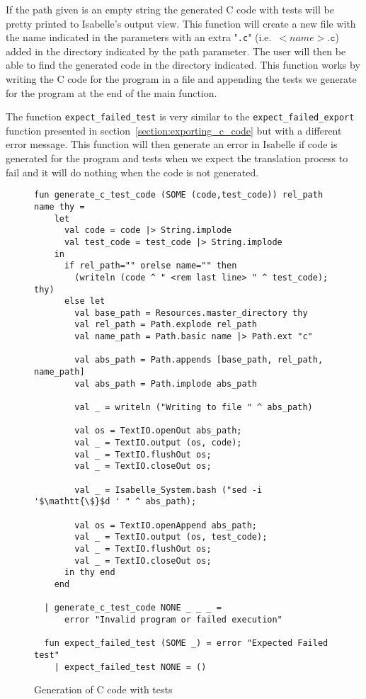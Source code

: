 If the path given is an empty string the generated C code with tests will be pretty printed to Isabelle's output view.
This function will create a new file with the name indicated in the parameters with an extra "\verb|.c|" (i.e.\ $<name>\mathtt{.c}$) added in the directory indicated by the path parameter.
The user will then be able to find the generated code in the directory indicated.
This function works by writing the C code for the program in a file and appending the tests we generate for the program at the end of the main function.

The function \verb|expect_failed_test| is very similar to the \verb|expect_failed_export| function presented in section~\ref{section:exporting_c_code} but with a different error message.
This function will then generate an error in Isabelle if code is generated for the program and tests when we expect the translation process to fail and it will do nothing when the code is not generated.

\begin{figure}
\begin{lstlisting}[mathescape=true]
  fun generate_c_test_code (SOME (code,test_code)) rel_path name thy =
    let
      val code = code |> String.implode
      val test_code = test_code |> String.implode
    in
      if rel_path="" orelse name="" then
        (writeln (code ^ " <rem last line> " ^ test_code); thy)
      else let
        val base_path = Resources.master_directory thy
        val rel_path = Path.explode rel_path
        val name_path = Path.basic name |> Path.ext "c"

        val abs_path = Path.appends [base_path, rel_path, name_path]
        val abs_path = Path.implode abs_path

        val _ = writeln ("Writing to file " ^ abs_path)

        val os = TextIO.openOut abs_path;
        val _ = TextIO.output (os, code);
        val _ = TextIO.flushOut os;
        val _ = TextIO.closeOut os;

        val _ = Isabelle_System.bash ("sed -i '$\mathtt{\$}$d ' " ^ abs_path);

        val os = TextIO.openAppend abs_path;
        val _ = TextIO.output (os, test_code);
        val _ = TextIO.flushOut os;
        val _ = TextIO.closeOut os;
      in thy end
    end

  | generate_c_test_code NONE _ _ _ =
      error "Invalid program or failed execution"

  fun expect_failed_test (SOME _) = error "Expected Failed test"
    | expect_failed_test NONE = ()
\end{lstlisting}

\caption{Generation of C code with tests}
\label{fig:generate_c_test_code}
\end{figure}


